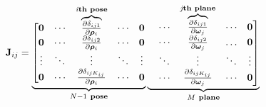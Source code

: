\documentclass{vgtc}                          %
\newcommand\overmat[2]{%
			\smash{\overbrace{{%
			\begin{matrix}#2\end{matrix}}}^{\text{\color{black}#1}}}\vphantom{#2}}
\begin{document}
\begin{equation} \label{equ_Jij}
\mathbf{J}_{ij} =\underbrace{ \left[ \begin{matrix}
	\mathbf{0} & \cdots & \overmat{\textit{i}\textbf{th pose}}{\frac{\partial \delta_{ij1} }{\partial {\bm{\rho}}_{i}}} & \cdots  & \mathbf{0} \\
	\mathbf{0} & \cdots & 	\frac{\partial \delta_{ij2} }{\partial {\bm{\rho}}_{i}} &\cdots  & \mathbf{0} \\
	\vdots & \ddots & 	\vdots & \ddots & \vdots \\
	\mathbf{0}& \cdots & 	\frac{\partial \delta_{ij{K_{ij}}} }{\partial {\bm{\rho}}_{i}} & \cdots &  \mathbf{0} \\
\end{matrix} \right. }_{N-1 \ \text{\textbf{pose}}} 
\underbrace{
	\left.
	\begin{matrix}
		\quad \cdots &  \overmat{\textit{j}\textbf{th plane}}{\frac{\partial \delta_{ij1} }{\partial {\bm{\omega}}_{j}}}  & \cdots & \mathbf{0} \\
		\quad \cdots & \frac{\partial \delta_{ij2} }{\partial {\bm{\omega}}_{j}} & \dots & \mathbf{0} \\
		\quad \ddots& \vdots & \ddots &\vdots \\
		\quad \cdots & \frac{\partial \delta_{ij{K_{ij}}} }{\partial {\bm{\omega}}_{j}} & \cdots & \mathbf{0} \\
	\end{matrix}
	\right] }_{M \ \text{\textbf{plane}}}
\end{equation}
\end{document}
